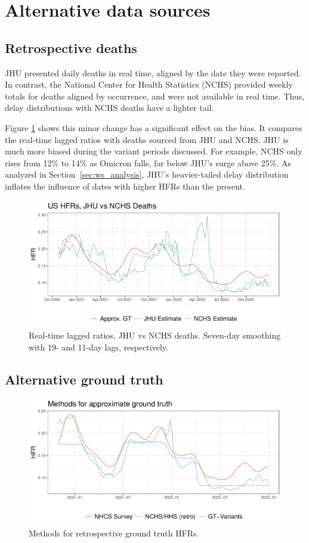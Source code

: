 \documentclass{article}
\begin{document}
\section{Alternative data sources}
\subsection{Retrospective deaths}\label{apx:NCHS_deaths}

JHU presented daily deaths in real time, aligned by the date they were reported. In contrast, the National Center for Health Statistics (NCHS) provided weekly totals for deaths aligned by occurrence, and were not available in real time. Thus, delay distributions with NCHS deaths have a lighter tail. 

Figure \ref{fig:jhu_vs_nchs} shows this minor change has a significant effect on the bias. It compares the real-time lagged ratios with deaths sourced from JHU and NCHS. JHU is much more biased during the variant periods discussed. For example, NCHS only rises from 12\% to 14\% as Omicron falls, far below JHU's surge above 25\%. As analyzed in Section~\ref{sec:ws_analysis}, JHU's heavier-tailed delay distribution inflates the influence of dates with higher HFRs than the present.


\begin{figure}
    \centering
    \includegraphics[width=0.7\linewidth]{Figures/Real/jhu_vs_nchs.pdf}
    \caption{Real-time lagged ratios, JHU vs NCHS deaths. Seven-day smoothing with 19- and 11-day lags, respectively.}
    \label{fig:jhu_vs_nchs}
\end{figure}


\subsection{Alternative ground truth}\label{apx:alt_gt}

\begin{figure}
    \centering
    \includegraphics[width=0.7\linewidth]{Figures/Real/ApproxGT.pdf}
    \caption{Methods for retrospective ground truth HFRs.}
    \label{fig:approxGT}
\end{figure}
\end{document}
